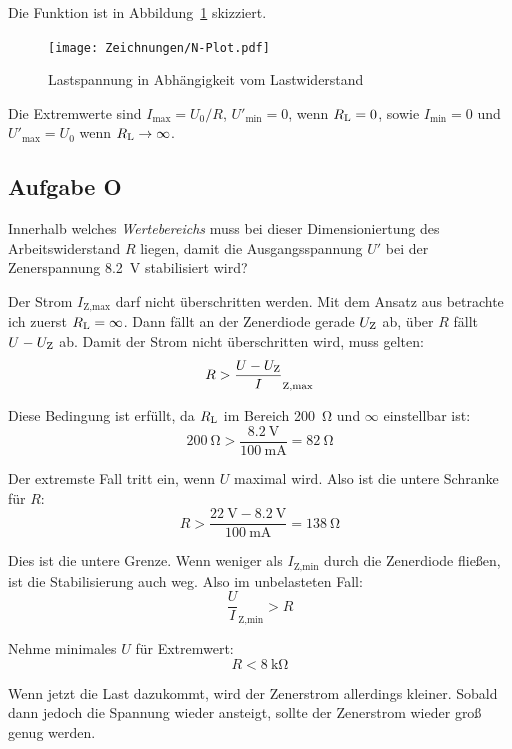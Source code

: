 Die Funktion ist in Abbildung~\ref{fig:N-Plot} skizziert.

\begin{figure}[htbp]
	\centering
	\caption{%
		Lastspannung in Abhängigkeit vom Lastwiderstand
	}
	\label{fig:N-Plot}
	\texttt{[image: Zeichnungen/N-Plot.pdf]}
\end{figure}

Die Extremwerte sind $I_\text{max} = U_0/R$, $U'_\text{min} = 0$, wenn $R_\text L =
0$, sowie $I_\text{min} = 0$ und $U'_\text{max} = U_0$ wenn $R_\text L \to \infty$.

\FloatBarrier
\subsection{Aufgabe O}
\label{ss:O}

\begin{problem}
	Innerhalb welches \emph{Wertebereichs} muss bei dieser Dimensioniertung
	des Arbeitswiderstand $R$ liegen, damit die Ausgangsspannung $U'$ bei der
	Zenerspannung \SI{8.2}{\volt} stabilisiert wird?
\end{problem}

\newcommand\IZmax{I_\text{Z,max}}
\newcommand\IZmin{I_\text{Z,min}}
\newcommand\IZ{I_\text Z}
\newcommand\UZ{U_\text Z}

Der Strom $\IZmax$ darf nicht überschritten werden. Mit dem Ansatz aus 
\cite[§15.1.3]{beuth/elementare_elektronik} betrachte ich zuerst $R_\text L =
\infty$. Dann fällt an der Zenerdiode gerade $\UZ$ ab, über $R$ fällt $U - \UZ$
ab. Damit der Strom nicht überschritten wird, muss gelten:
\[
	R > \frac{U - \UZ}\IZmax
\]

Diese Bedingung ist erfüllt, da $R_\text L$ im Bereich \SI{200}{\ohm} und
$\infty$ einstellbar ist:
\[
	\SI{200}\ohm > \frac{\SI{8.2}\volt}{\SI{100}{\milli\ampere}} = \SI{82}\ohm
\]

Der extremste Fall tritt ein, wenn $U$ maximal wird. Also ist die untere
Schranke für $R$:
\[
	R > \frac{\SI{22}\volt - \SI{8.2}\volt}{\SI{100}{\milli\ampere}}
	= \SI{138}\ohm
\]

Dies ist die untere Grenze. Wenn weniger als $\IZmin$ durch die Zenerdiode
fließen, ist die Stabilisierung auch weg. Also im unbelasteten Fall:
\[
	\frac U\IZmin > R
\]

Nehme minimales $U$ für Extremwert:
\[
	R < \SI{8}{\kilo\ohm}
\]

Wenn jetzt die Last dazukommt, wird der Zenerstrom allerdings kleiner. Sobald
dann jedoch die Spannung wieder ansteigt, sollte der Zenerstrom wieder groß
genug werden.

